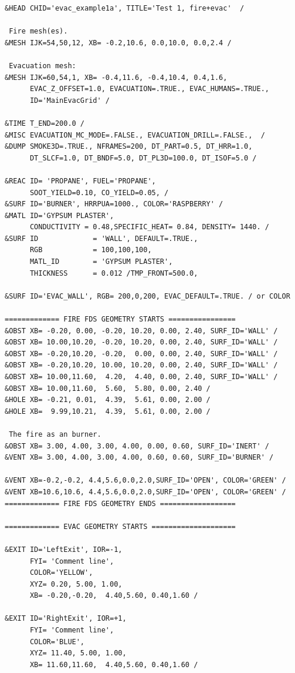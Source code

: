 \documentclass[12pt,a4paper,final,twoside]{stylevk}
\begin{document}
{\fontsize{10}{13}
\selectfont
\begin{verbatim}
&HEAD CHID='evac_example1a', TITLE='Test 1, fire+evac'  / 

 Fire mesh(es).
&MESH IJK=54,50,12, XB= -0.2,10.6, 0.0,10.0, 0.0,2.4 /

 Evacuation mesh:
&MESH IJK=60,54,1, XB= -0.4,11.6, -0.4,10.4, 0.4,1.6, 
      EVAC_Z_OFFSET=1.0, EVACUATION=.TRUE., EVAC_HUMANS=.TRUE., 
      ID='MainEvacGrid' /

&TIME T_END=200.0 / 
&MISC EVACUATION_MC_MODE=.FALSE., EVACUATION_DRILL=.FALSE.,  / 
&DUMP SMOKE3D=.TRUE., NFRAMES=200, DT_PART=0.5, DT_HRR=1.0,
      DT_SLCF=1.0, DT_BNDF=5.0, DT_PL3D=100.0, DT_ISOF=5.0 /

&REAC ID= 'PROPANE', FUEL='PROPANE',
      SOOT_YIELD=0.10, CO_YIELD=0.05, /
&SURF ID='BURNER', HRRPUA=1000., COLOR='RASPBERRY' /
&MATL ID='GYPSUM PLASTER',
      CONDUCTIVITY = 0.48,SPECIFIC_HEAT= 0.84, DENSITY= 1440. /
&SURF ID             = 'WALL', DEFAULT=.TRUE., 
      RGB            = 100,100,100,
      MATL_ID        = 'GYPSUM PLASTER',
      THICKNESS      = 0.012 /TMP_FRONT=500.0,

&SURF ID='EVAC_WALL', RGB= 200,0,200, EVAC_DEFAULT=.TRUE. / or COLOR

============= FIRE FDS GEOMETRY STARTS ================
&OBST XB= -0.20, 0.00, -0.20, 10.20, 0.00, 2.40, SURF_ID='WALL' /
&OBST XB= 10.00,10.20, -0.20, 10.20, 0.00, 2.40, SURF_ID='WALL' /
&OBST XB= -0.20,10.20, -0.20,  0.00, 0.00, 2.40, SURF_ID='WALL' /
&OBST XB= -0.20,10.20, 10.00, 10.20, 0.00, 2.40, SURF_ID='WALL' /
&OBST XB= 10.00,11.60,  4.20,  4.40, 0.00, 2.40, SURF_ID='WALL' /
&OBST XB= 10.00,11.60,  5.60,  5.80, 0.00, 2.40 /
&HOLE XB= -0.21, 0.01,  4.39,  5.61, 0.00, 2.00 /
&HOLE XB=  9.99,10.21,  4.39,  5.61, 0.00, 2.00 /

 The fire as an burner.
&OBST XB= 3.00, 4.00, 3.00, 4.00, 0.00, 0.60, SURF_ID='INERT' /
&VENT XB= 3.00, 4.00, 3.00, 4.00, 0.60, 0.60, SURF_ID='BURNER' /

&VENT XB=-0.2,-0.2, 4.4,5.6,0.0,2.0,SURF_ID='OPEN', COLOR='GREEN' / 
&VENT XB=10.6,10.6, 4.4,5.6,0.0,2.0,SURF_ID='OPEN', COLOR='GREEN' / 
============= FIRE FDS GEOMETRY ENDS ==================

============= EVAC GEOMETRY STARTS ====================

&EXIT ID='LeftExit', IOR=-1,
      FYI= 'Comment line',
      COLOR='YELLOW',
      XYZ= 0.20, 5.00, 1.00,
      XB= -0.20,-0.20,  4.40,5.60, 0.40,1.60 /

&EXIT ID='RightExit', IOR=+1,
      FYI= 'Comment line',
      COLOR='BLUE',
      XYZ= 11.40, 5.00, 1.00,
      XB= 11.60,11.60,  4.40,5.60, 0.40,1.60 /


\end{verbatim}}
\end{document}
